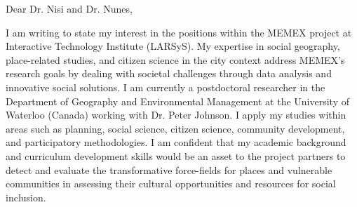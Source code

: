 


Dear Dr. Nisi and Dr. Nunes,


I am writing to state my interest in the positions within the MEMEX project at Interactive Technology Institute (LARSyS). My expertise in social geography, place-related studies, and citizen science in the city context address MEMEX's research goals by dealing with societal challenges through data analysis and innovative social solutions. I am currently a postdoctoral researcher in the Department of Geography and Environmental Management at the University of Waterloo (Canada) working with Dr. Peter Johnson. I apply my studies within areas such as planning, social science, citizen science, community development, and participatory methodologies. I am confident that my academic background and curriculum development skills would be an asset to the project partners to detect and evaluate the transformative force-fields for places and vulnerable communities in assessing their cultural opportunities and resources for social inclusion.



